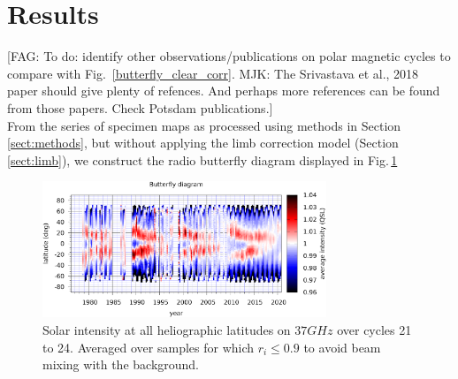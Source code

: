 \documentclass{aa}
\newcommand{\fag}[1]{\textcolor{midpurple}{[FAG: #1]}} %
\begin{document}








\section{Results}\label{sect:results}
\fag{To do: identify other observations/publications on polar magnetic cycles to compare with
Fig.~\ref{butterfly_clear_corr}. MJK: The Srivastava et al., 2018 paper should give plenty of refences. And perhaps more references can be found from those papers. Check Potsdam publications.}\\

From the series of specimen maps as processed using methods in 
Section\,\ref{sect:methods}, but without applying the limb correction model
(Section\,\ref{sect:limb}), we construct the radio butterfly diagram  
displayed in Fig.\,\ref{butterfly_clear_raw}

\begin{figure}
\centering
\includegraphics[width=8.5cm]{butterfly_clear_raw.png}
\caption{Solar intensity at all heliographic latitudes on $\si{37}{GHz}$ over cycles 21 to 24. Averaged over samples for which $r_i \le 0.9$ to avoid beam mixing with the background.
}
\label{butterfly_clear_raw}
\end{figure}
\end{document}
